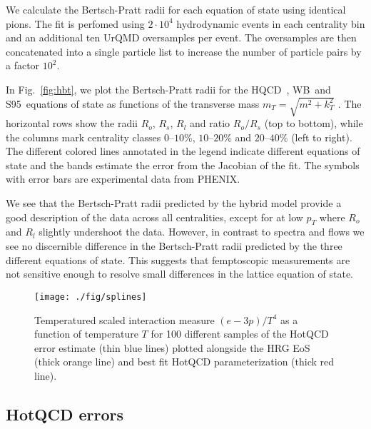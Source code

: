 \documentclass[aps,prc,reprint,amsmath,nofootinbib,superscriptaddress]{revtex4-1}
\newcommand{\hotqcd}{HQCD~}
\newcommand{\wb}{WB~}
\newcommand{\spv}{S95~}
\begin{document}
We calculate the Bertsch-Pratt radii for each equation of state using identical pions. The fit is perfomed using $2\cdot10^4$ hydrodynamic events in each centrality bin and an additional ten UrQMD oversamples per event. 
The oversamples are then concatenated into a single particle list to increase the number of particle pairs by a factor $10^2$.

In Fig.~\ref{fig:hbt}, we plot the Bertsch-Pratt radii for the \hotqcd, \wb and \spv equations of state as functions of the transverse mass $m_T = \sqrt{m^2 + k_T^2}$ . The horizontal rows show the radii $R_o$, $R_s$, $R_l$ and ratio $R_o/R_s$ (top to bottom), while the columns 
mark centrality classes $0$--$10\%$, $10$--$20\%$ and $20$--$40\%$ (left to right). The different colored lines annotated in the legend indicate different equations of state and the bands estimate the error from the Jacobian 
of the fit. The symbols with error bars are experimental data from PHENIX.

We see that the Bertsch-Pratt radii predicted by the hybrid model provide a good description of the data across all centralities, except for at low $p_T$ where $R_o$ and $R_l$ slightly undershoot the data. However, in contrast to
spectra and flows we see no discernible difference in the Bertsch-Pratt radii predicted by the three different equations of state. This suggests that femptoscopic measurements are not sensitive enough to resolve small differences
in the lattice equation of state.

\begin{figure}[b]
  \texttt{[image: ./fig/splines]}
  \caption{
    \label{fig:splines}
    Temperatured scaled interaction measure $(e-3 p)/T^4$ as a function of temperature $T$ for 100 different samples of the HotQCD error estimate (thin blue lines) plotted alongside the HRG EoS (thick orange line) and best fit HotQCD parameterization (thick red line).
  }
\end{figure}


\subsection{HotQCD errors}
\label{errors}
\end{document}
